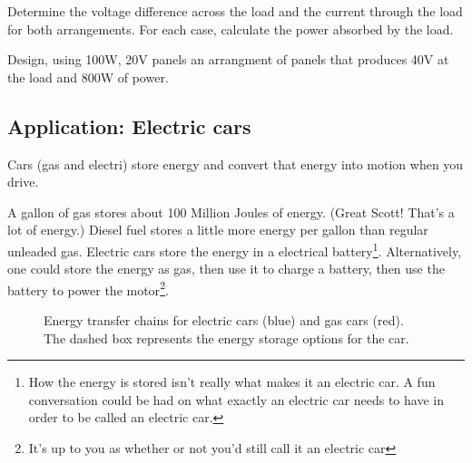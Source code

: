 \begin{blevel}
Determine the voltage difference across the load and the current through the load for both arrangements. For each case, calculate the power absorbed by the load.
\end{blevel}

\begin{clevel}
Design, using 100W, 20V panels an arrangment of panels that produces 40V at the load and 800W of power.
\end{clevel}

\subsection{Application: Electric cars}
Cars (gas and electri) store energy and convert that energy into motion when you drive.\par

A gallon of gas stores about 100 Million Joules of energy. (Great Scott! That's a lot of energy.) Diesel fuel stores a little more energy per gallon than regular unleaded gas. Electric cars store the energy in a electrical battery\footnote{How the energy is stored isn't really what makes it an electric car. A fun conversation could be had on what exactly an electric car needs to have in order to be called an electric car.}. Alternatively, one could store the energy as gas, then use it to charge a battery, then use the battery to power the motor\footnote{It's up to you as whether or not you'd still call it an electric car}.

\begin{figure}[H]
\begin{center}
\caption{Energy transfer chains for electric cars (blue) and gas cars (red). The dashed box represents the energy storage options for the car.}
\end{center}
\end{figure}

